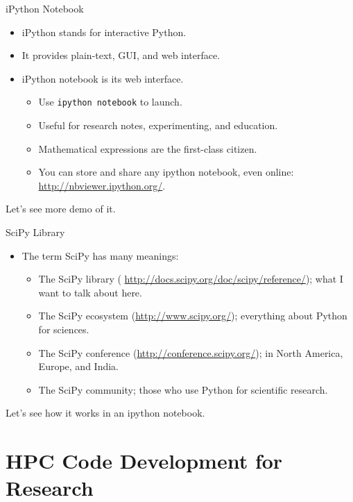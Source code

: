\documentclass[dvips,xcolor=pst,14pt]{beamer}
\begin{document}
\begin{frame}[fragile]{
%
iPython Notebook
%
}
\begin{itemize}
  \item iPython stands for interactive Python.
  \item It provides plain-text, GUI, and web interface.
  \item iPython notebook is its web interface.
  \begin{itemize}
    \item Use {\small \verb+ipython notebook+} to launch.
    \item Useful for research notes, experimenting, and education.
    \item Mathematical expressions are the first-class citizen.
    \item You can store and share any ipython notebook, even online:
    \url{http://nbviewer.ipython.org/}.
  \end{itemize}
\end{itemize}
Let's see more demo of it.
\end{frame}

\begin{frame}[fragile]{
%
SciPy Library
%
}
\begin{itemize}
\item The term SciPy has many meanings:
  \begin{itemize}
    \item The SciPy library ({\small
    \url{http://docs.scipy.org/doc/scipy/reference/}}); what I want to talk
    about here.
    \item The SciPy ecosystem ({\small \url{http://www.scipy.org/}});
    everything about Python for sciences.
    \item The SciPy conference ({\small \url{http://conference.scipy.org/}});
    in North America, Europe, and India.
    \item The SciPy community; those who use Python for scientific research.
  \end{itemize}
\end{itemize}
Let's see how it works in an ipython notebook.
\end{frame}

\section{
HPC Code Development for Research
}
\end{document}
